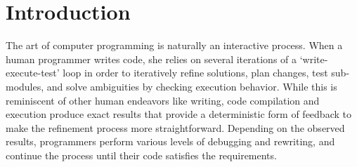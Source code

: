 \section{Introduction}
\label{sec:intro}



The art of computer programming is naturally an interactive process. When a human programmer writes code, she relies on several iterations of a `write-execute-test' loop in order to iteratively refine solutions, plan changes, test sub-modules, and solve ambiguities by checking execution behavior. While this is reminiscent of other human endeavors like writing, code compilation and execution produce exact results that provide a deterministic form of feedback to make the refinement process more straightforward. Depending on the observed results, programmers perform various levels of debugging and rewriting, and continue the process until their code satisfies the requirements.


